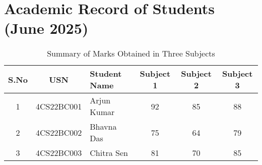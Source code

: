 \documentclass{article}
\begin{document}
\section*{Academic Record of Students (June 2025)}

\begin{table}[h!]
\centering
\captionsetup{font=small, labelfont=bf}
\caption{Summary of Marks Obtained in Three Subjects}

\begin{tabularx}{\textwidth}{|c|c|X|c|c|c|}
\hline
\textbf{S.No} & \textbf{USN} & \textbf{Student Name} & \textbf{Subject 1} & \textbf{Subject 2} & \textbf{Subject 3} \\
\hline
1 & 4CS22BC001 & Arjun Kumar & 92 & 85 & 88 \\
2 & 4CS22BC002 & Bhavna Das & 75 & 64 & 79 \\
3 & 4CS22BC003 & Chitra Sen & 81 & 70 & 85 \\
\hline
\end{tabularx}
\end{table}
\end{document}
